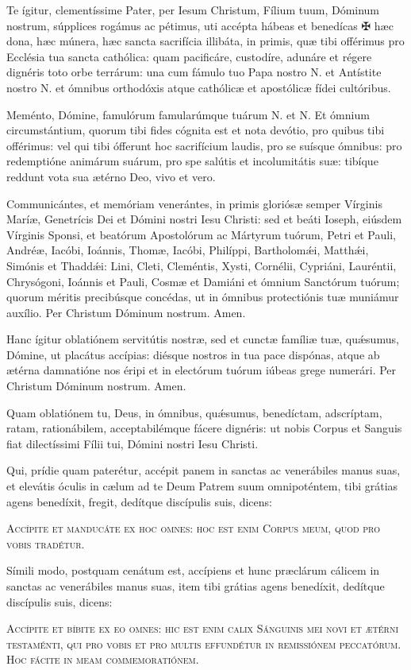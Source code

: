 Te ígitur, clementíssime Pater, per Iesum Christum, Fílium tuum, Dóminum nostrum, súpplices rogámus ac pétimus, uti accépta hábeas et benedícas {\color{red}✠} hæc dona, hæc múnera, hæc sancta sacrifícia illibáta, in primis, quæ tibi offérimus pro Ecclésia tua sancta cathólica: quam pacificáre, custodíre, adunáre et régere dignéris toto orbe terrárum: una cum fámulo tuo Papa nostro {\color{red}N.} et Antístite nostro {\color{red}N.} \grestar{} et ómnibus orthodóxis atque cathólicæ et apostólicæ fídei cultóribus.

Meménto, Dómine, famulórum famularúmque tuárum {\color{red}N.} et {\color{red}N.} Et ómnium circumstántium, quorum tibi fides cógnita est et nota devótio, pro quibus tibi offérimus: vel qui tibi ófferunt hoc sacrifícium laudis, pro se suísque ómnibus: pro redemptióne animárum suárum, pro spe salútis et incolumitátis suæ: tibíque reddunt vota sua ætérno Deo, vivo et vero.

Communicántes, et memóriam venerántes, in primis gloriósæ semper Vírginis Maríæ, Genetrícis Dei et Dómini nostri Iesu Christi: sed et beáti Ioseph, eiúsdem Vírginis Sponsi, et beatórum Apostolórum ac Mártyrum tuórum, Petri et Pauli, Andréæ, Iacóbi, Ioánnis, Thomæ, Iacóbi, Philíppi, Bartholomǽi, Matthǽi, Simónis et Thaddǽi: Lini, Cleti, Cleméntis, Xysti, Cornélii, Cypriáni, Lauréntii, Chrysógoni, Ioánnis et Pauli, Cosmæ et Damiáni et ómnium Sanctórum tuórum; quorum méritis precibúsque concédas, ut in ómnibus protectiónis tuæ muniámur auxílio. Per Christum Dóminum nostrum. Amen.

Hanc ígitur oblatiónem servitútis nostræ, sed et cunctæ famíliæ tuæ, quǽsumus, Dómine, ut placátus accípias: diésque nostros in tua pace dispónas, atque ab ætérna damnatióne nos éripi et in electórum tuórum iúbeas grege numerári. Per Christum Dóminum nostrum. Amen.

Quam oblatiónem tu, Deus, in ómnibus, quǽsumus, benedíctam, adscríptam, ratam, rationábilem, acceptabilémque fácere dignéris: ut nobis Corpus et Sanguis fiat dilectíssimi Fílii tui, Dómini nostri Iesu Christi.

Qui, prídie quam paterétur, accépit panem in sanctas ac venerábiles manus suas, et elevátis óculis in cælum ad te Deum Patrem suum omnipoténtem, tibi grátias agens benedíxit, fregit, dedítque discípulis suis, dicens:

\textsc{Accípite et manducáte ex hoc omnes: hoc est enim Corpus meum, quod pro vobis tradétur.}

Símili modo, postquam cenátum est, accípiens et hunc præclárum cálicem in sanctas ac venerábiles manus suas, item tibi grátias agens benedíxit, dedítque discípulis suis, dicens:

\textsc{Accípite et bíbite ex eo omnes: hic est enim calix Sánguinis mei novi et ætérni testaménti, qui pro vobis et pro multis effundétur in remissiónem peccatórum. Hoc fácite in meam commemoratiónem.}

